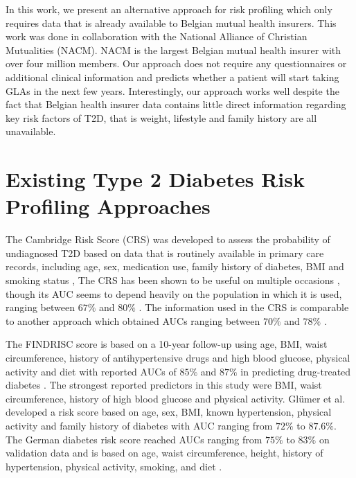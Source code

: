 In this work, we present an alternative approach for risk profiling which only requires data that is already available to Belgian mutual health insurers. This work was done in  collaboration with the National Alliance of Christian Mutualities (NACM). NACM is the largest Belgian mutual health insurer with over four million members. Our approach does not require any questionnaires or additional clinical information and predicts whether a patient will start taking GLAs in the next few years. Interestingly, our approach works well despite the fact that Belgian health insurer data contains little direct information regarding key risk factors of T2D, that is weight, lifestyle and family history are all unavailable.


\section{Existing Type 2 Diabetes Risk Profiling Approaches} \label{sec:stateoftheart}
The Cambridge Risk Score (CRS) was developed to assess the probability of undiagnosed T2D based on data that is routinely available in primary care records, including age, sex, medication use, family history of diabetes, BMI and smoking status \citep{griffin2000diabetes}, The CRS has been shown to be useful on multiple occasions \citep{griffin2000diabetes, park2002performance, spijkerman2004performance}, though its AUC seems to depend heavily on the population in which it is used, ranging between $67\%$ \citep{spijkerman2004performance} and $80\%$ \citep{griffin2000diabetes}. The information used in the CRS is comparable to another approach which obtained AUCs ranging between $70\%$ and $78\%$ \citep{baan1999performance}.

The FINDRISC score is based on a 10-year follow-up using age, BMI, waist circumference, history of antihypertensive drugs and high blood glucose, physical activity and diet with reported AUCs of $85\%$ and $87\%$ in predicting drug-treated diabetes \citep{lindstrom2003diabetes}. The strongest reported predictors in this study were BMI, waist circumference, history of high blood glucose and physical activity. Gl{\"u}mer et al. \citep{glumer2004danish} developed a risk score based on age, sex, BMI, known hypertension, physical activity and family history of diabetes with AUC ranging from $72\%$ to $87.6\%$. The German diabetes risk score reached AUCs ranging from $75\%$ to $83\%$ on validation data and is based on age, waist circumference, height, history of hypertension, physical activity, smoking, and diet \citep{schulze2007accurate}.

